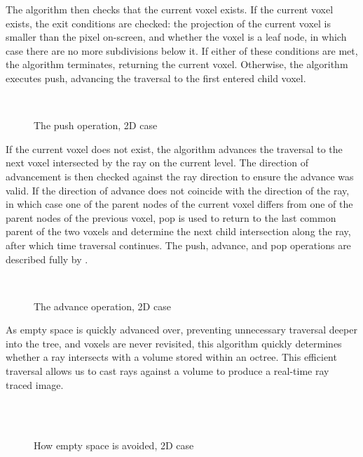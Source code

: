 The algorithm then checks that the current voxel exists. If the current voxel exists, the exit conditions are checked: the projection of the current voxel is smaller than the pixel on-screen, and whether the voxel is a leaf node, in which case there are no more subdivisions below it. If either of these conditions are met, the algorithm terminates, returning the current voxel. Otherwise, the algorithm executes push, advancing the traversal to the first entered child voxel.

\begin{figure}
\centering
	\centering
	~

	\caption{The push operation, 2D case}
	\label{fig:ray_push}
\end{figure}

If the current voxel does not exist, the algorithm advances the traversal to the next voxel intersected by the ray on the current level. The direction of advancement is then checked against the ray direction to ensure the advance was valid. If the direction of advance does not coincide with the direction of the ray, in which case one of the parent nodes of the current voxel differs from one of the parent nodes of the previous voxel, pop is used to return to the last common parent of the two voxels and determine the next child intersection along the ray, after which time traversal continues. The push, advance, and pop operations are described fully by \cite{laine10efficientsvos}.

\begin{figure}
\centering
	~

	\caption{The advance operation, 2D case}
	\label{fig:ray_advance}
\end{figure}

As empty space is quickly advanced over, preventing unnecessary traversal deeper into the tree, and voxels are never revisited, this algorithm quickly determines whether a ray intersects with a volume stored within an octree. This efficient traversal allows us to cast rays against a volume to produce a real-time ray traced image.

\begin{figure}
\centering
	~
	\\
	~
	\\

	\caption{How empty space is avoided, 2D case}
	\label{fig:empty-space}
\end{figure}

